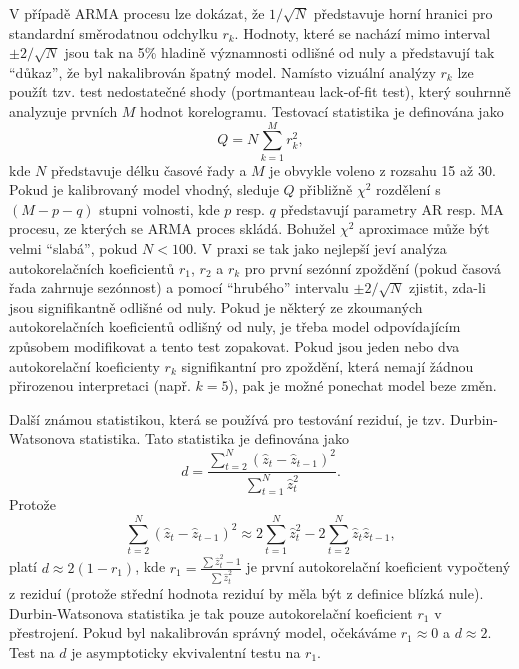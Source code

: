 V případě ARMA procesu lze dokázat, že $1 / \sqrt{N}$ představuje horní hranici pro standardní směrodatnou odchylku $r_k$. Hodnoty, které se nachází mimo interval $\pm 2 / \sqrt{N}$ jsou tak na 5\% hladině významnosti odlišné od nuly a představují tak ``důkaz'', že byl nakalibrován špatný model. Namísto vizuální analýzy $r_k$ lze použít tzv. test nedostatečné shody (portmanteau lack-of-fit test), který souhrnně analyzuje prvních $M$ hodnot korelogramu. Testovací statistika je definována jako
\begin{equation}
Q = N \sum_{k = 1}^M r_k^2,
\end{equation}
kde $N$ představuje délku časové řady a $M$ je obvykle voleno z rozsahu 15 až 30. Pokud je kalibrovaný model vhodný, sleduje $Q$ přibližně $\chi^2$ rozdělení s $(M - p - q)$ stupni volnosti, kde $p$ resp. $q$ představují parametry AR resp. MA procesu, ze kterých se ARMA proces skládá. Bohužel $\chi^2$ aproximace může být velmi ``slabá'', pokud $N < 100$. V praxi se tak jako nejlepší jeví analýza autokorelačních koeficientů $r_1$, $r_2$ a $r_k$ pro první sezónní zpoždění (pokud časová řada zahrnuje sezónnost) a pomocí ``hrubého'' intervalu $\pm 2 / \sqrt{N}$ zjistit, zda-li jsou signifikantně odlišné od nuly. Pokud je některý ze zkoumaných autokorelačních koeficientů odlišný od nuly, je třeba model odpovídajícím způsobem modifikovat a tento test zopakovat. Pokud jsou jeden nebo dva autokorelační koeficienty $r_k$ signifikantní pro zpoždění, která nemají žádnou přirozenou interpretaci (např. $k = 5$), pak je možné ponechat model beze změn.

Další známou statistikou, která se používá pro testování reziduí, je tzv. Durbin-Watsonova statistika. Tato statistika je definována jako
\begin{equation}
d = \frac{\sum_{t = 2}^N (\hat{z}_t - \hat{z}_{t - 1})^2}{\sum_{t = 1}^N \hat{z}_t^2}.
\end{equation}
Protože
\begin{equation}
\sum_{t=2}^N (\hat{z}_t - \hat{z}_{t - 1})^2 \approx 2\sum_{t = 1}^N \hat{z}_t^2 - 2 \sum_{t = 2}^N \hat{z}_t \hat{z}_{t - 1},
\end{equation}
platí $d \approx 2(1 - r_1)$, kde $r_1 = \frac{\sum \hat{z}_t^2 - 1}{\sum \hat{z}_t^2}$ je první autokorelační koeficient vypočtený z reziduí (protože střední hodnota reziduí by měla být z definice blízká nule). Durbin-Watsonova statistika je tak pouze autokorelační koeficient $r_1$ v přestrojení. Pokud byl nakalibrován správný model, očekáváme $r_1 \approx 0$ a $d \approx 2$. Test na $d$ je asymptoticky ekvivalentní testu na $r_1$.

